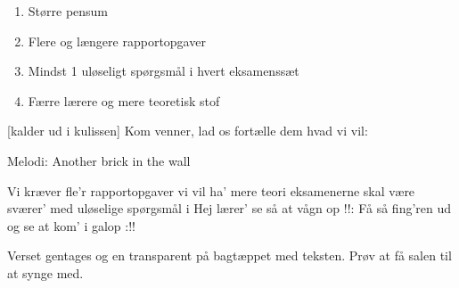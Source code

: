 \documentclass[a4paper,11pt]{article}
\begin{document}
\begin{sketch}
  \begin{enumerate}
    \item Større pensum
    \item Flere og længere rapportopgaver
    \item Mindst 1 uløseligt spørgsmål i hvert eksamenssæt
    \item Færre lærere og mere teoretisk stof
  \end{enumerate}

  [kalder ud i kulissen] Kom venner, lad os fortælle dem hvad vi vil:
\end{sketch}

Melodi: Another brick in the wall

\begin{song}
Vi kræver fle'r rapportopgaver
vi vil ha' mere teori
eksamenerne skal være sværer'
med uløselige spørgsmål i
Hej lærer' se så at vågn op
!!: Få så fing'ren ud og se at kom' i galop :!!
\end{song}

Verset gentages og en transparent på bagtæppet med teksten.  Prøv at
få salen til at synge med.
\end{document}
